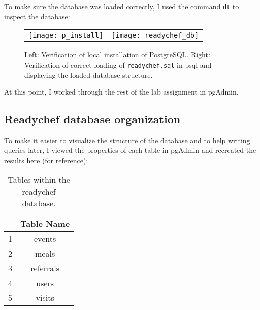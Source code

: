 \documentclass[]{article}
\newcommand{\code}[1]{\colorbox{light-gray}{\texttt{#1}}}
\begin{document}
To make sure the database was loaded correctly, I used the command \code{dt} to inspect the database:

\begin{figure}[!h]
	\begin{tabular}{ll}
		\texttt{[image: p\_install]}
		&
		\texttt{[image: readychef\_db]}
	\end{tabular}
	\caption{Left: Verification of local installation of PostgreSQL.  Right: Verification of correct loading of \code{readychef.sql} in psql and displaying the loaded database structure.}
	\label{Fig:Race}
\end{figure}
At this point, I worked through the rest of the lab assignment in pgAdmin.
\subsection{Readychef database organization}
To make it easier to visualize the structure of the database and to help writing queries later, I viewed the properties of each table in pgAdmin and recreated the results here (for reference):
\pagebreak

\begin{table}[!ht]
	\begin{center}
		\caption{Tables within the readychef database.}
		\label{tab:table1}
		\begin{tabular}{|c|c|} 
			\hline
			\textbf{} & \textbf{Table Name}\\
			\hline
			1 & events \\
			2 & meals \\
			3 & referrals \\
			4 & users \\
			5 & visits \\
			\hline
		\end{tabular}
	\end{center}
\end{table}
\end{document}
